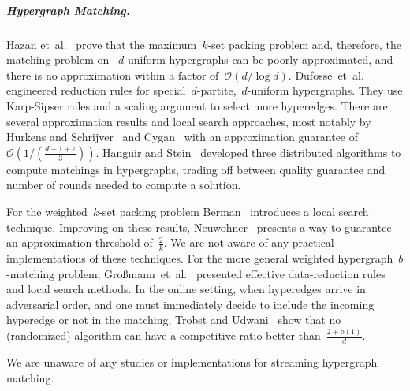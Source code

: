 \subparagraph{Hypergraph Matching.}
Hazan et~al.~\cite{approxresult} prove that the maximum~$k$-set packing problem and, therefore, the matching problem on ~$d$-uniform hypergraphs can be poorly approximated, and there is no approximation within a factor of~$\mathcal{O}(d/\log d)$.
Dufosse~et~al.~\cite{dufosse2019effective} engineered reduction rules for special~$d$-partite,~$d$-uniform hypergraphs.
 They use Karp-Sipser rules and a scaling argument to select more hyperedges. 
There are several approximation results and local search approaches, most notably by Hurkens and Schrijver~\cite{hurkens1989size} and Cygan~\cite{cygan2013improved}  with an approximation guarantee of~$\mathcal{O}(1/\left(\frac{d+1+\varepsilon}{3}\right))$.
Hanguir and Stein~\cite{hanguir2021distributed} developed three distributed algorithms to compute  matchings in hypergraphs, trading off between quality guarantee and number of rounds needed to compute a solution.


For the weighted~$k$-set packing problem Berman~\cite{10.1007/3-540-44985-X_19} introduces a local search technique.
Improving on these results, Neuwohner~\cite{neuwohner2023passing} presents a way to guarantee an approximation threshold of~$\frac{2}{k}$. We are not aware of any practical implementations of these techniques.
For the more general weighted hypergraph~$b$-matching problem, 
Großmann~et~al.~\cite{grossmann2024engineering} presented effective data-reduction rules and local search methods.
In the online setting, when hyperedges arrive in adversarial order, and one must  immediately decide to include the incoming hyperedge or not in the matching, Trobst and Udwani~\cite{trobst2024almost} show that no (randomized) algorithm can have a competitive ratio better than~$\frac{2+o(1)}{d}$.

We are unaware of any studies or implementations for streaming hypergraph matching.